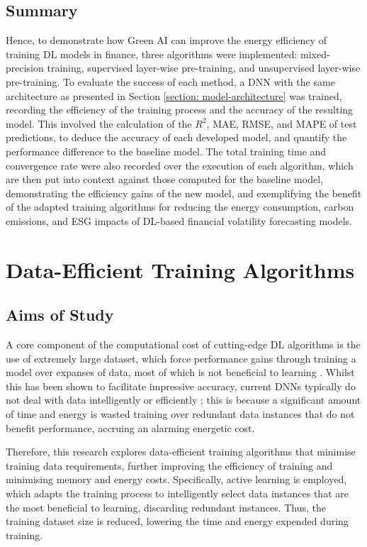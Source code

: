 \documentclass[a4paper, 11pt]{report}
\begin{document}
    \section{Summary}

    Hence, to demonstrate how Green AI can improve the energy efficiency of training DL models in finance, three algorithms were implemented: mixed-precision training, supervised layer-wise pre-training, and unsupervised layer-wise pre-training. To evaluate the success of each method, a DNN with the same architecture as presented in Section \ref{section: model-architecture} was trained, recording the efficiency of the training process and the accuracy of the resulting model. This involved the calculation of the $R^2$, MAE, RMSE, and MAPE of test predictions, to deduce the accuracy of each developed model, and quantify the performance difference to the baseline model. The total training time and convergence rate were also recorded over the execution of each algorithm, which are then put into context against those computed for the baseline model, demonstrating the efficiency gains of the new model, and exemplifying the benefit of the adapted training algorithms for reducing the energy consumption, carbon emissions, and ESG impacts of DL-based financial volatility forecasting models.


    \chapter{Data-Efficient Training Algorithms}
    \label{chapter: data-extensions}

    \section{Aims of Study}

    A core component of the computational cost of cutting-edge DL algorithms is the use of extremely large dataset, which force performance gains through training a model over expanses of data, most of which is not beneficial to learning \citep{bender-2021}. Whilst this has been shown to facilitate impressive accuracy, current DNNs typically do not deal with data intelligently or efficiently \citep{aljarrah-2015}; this is because a significant amount of time and energy is wasted training over redundant data instances that do not benefit performance, accruing an alarming energetic cost.

    Therefore, this research explores data-efficient training algorithms that minimise training data requirements, further improving the efficiency of training and minimising memory and energy costs. Specifically, active learning is employed, which adapts the training process to intelligently select data instances that are the most beneficial to learning, discarding redundant instances. Thus, the training dataset size is reduced, lowering the time and energy expended during training. 
\end{document}
